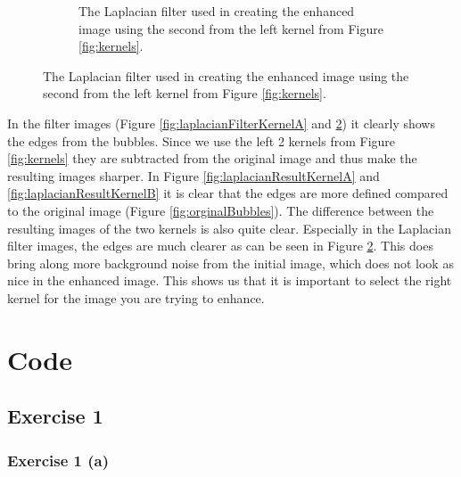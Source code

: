 \documentclass{article}
\begin{document}
\begin{figure}[H]
\begin{subfigure}[t]{0.40\textwidth}
        \caption{The Laplacian filter used in creating the enhanced image using the second from the left kernel from Figure \ref{fig:kernels}.}
        \label{fig:laplacianFilterKernelB}
    \end{subfigure}
\end{figure}

In the filter images (Figure \ref{fig:laplacianFilterKernelA} and \ref{fig:laplacianFilterKernelB}) it clearly shows the edges from the bubbles. Since we use the left 2 kernels from Figure \ref{fig:kernels} they are subtracted from the original image and thus make the resulting images sharper. In Figure \ref{fig:laplacianResultKernelA} and \ref{fig:laplacianResultKernelB} it is clear that the edges are more defined compared to the original image (Figure \ref{fig:orginalBubbles}). The difference between the resulting images of the two kernels is also quite clear. Especially in the Laplacian filter images, the edges are much clearer as can be seen in Figure \ref{fig:laplacianFilterKernelB}. This does bring along more background noise from the initial image, which does not look as nice in the enhanced image. This shows us that it is important to select the right kernel for the image you are trying to enhance.


\typeout{}


\appendix
\section{Code}
\subsection{Exercise 1}


\subsubsection{Exercise 1 (a)}

\end{document}

